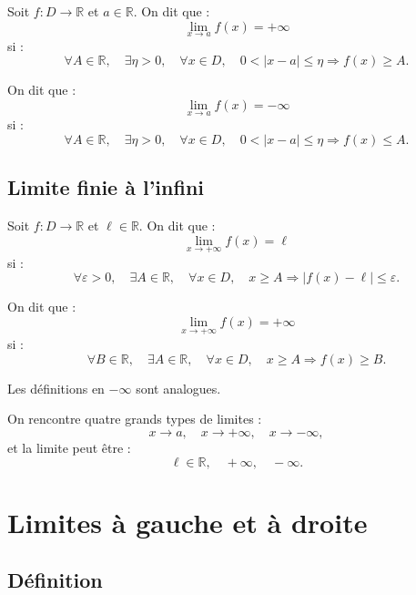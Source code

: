 \documentclass[11pt,a4paper]{article}
\newcommand{\R}{\mathbb R}
\newcommand{\implique}{\Longrightarrow}
\begin{document}
\begin{definitionbox}
Soit \(f:D\to\R\) et \(a\in\R\).  
On dit que :
\[
\lim_{x\to a}f(x)=+\infty
\]
si :
\[
\forall A\in\R,\quad \exists\eta>0,\quad \forall x\in D,\quad
0<|x-a|\leq\eta\implique f(x)\geq A.
\]
\end{definitionbox}

\begin{definitionbox}
On dit que :
\[
\lim_{x\to a}f(x)=-\infty
\]
si :
\[
\forall A\in\R,\quad \exists\eta>0,\quad \forall x\in D,\quad
0<|x-a|\leq\eta\implique f(x)\leq A.
\]
\end{definitionbox}

\subsection{Limite finie à l'infini}

\begin{definitionbox}
Soit \(f:D\to\R\) et \(\ell\in\R\).  
On dit que :
\[
\lim_{x\to+\infty}f(x)=\ell
\]
si :
\[
\forall \varepsilon>0,\quad \exists A\in\R,\quad \forall x\in D,\quad
x\geq A\implique |f(x)-\ell|\leq\varepsilon.
\]
\end{definitionbox}

\begin{definitionbox}
On dit que :
\[
\lim_{x\to+\infty}f(x)=+\infty
\]
si :
\[
\forall B\in\R,\quad \exists A\in\R,\quad \forall x\in D,\quad
x\geq A\implique f(x)\geq B.
\]
\end{definitionbox}

Les définitions en \(-\infty\) sont analogues.

\begin{retenirbox}
On rencontre quatre grands types de limites :
\[
x\to a,\quad x\to+\infty,\quad x\to-\infty,
\]
et la limite peut être :
\[
\ell\in\R,\quad +\infty,\quad -\infty.
\]
\end{retenirbox}

\section{Limites à gauche et à droite}

\subsection{Définition}
\end{document}

